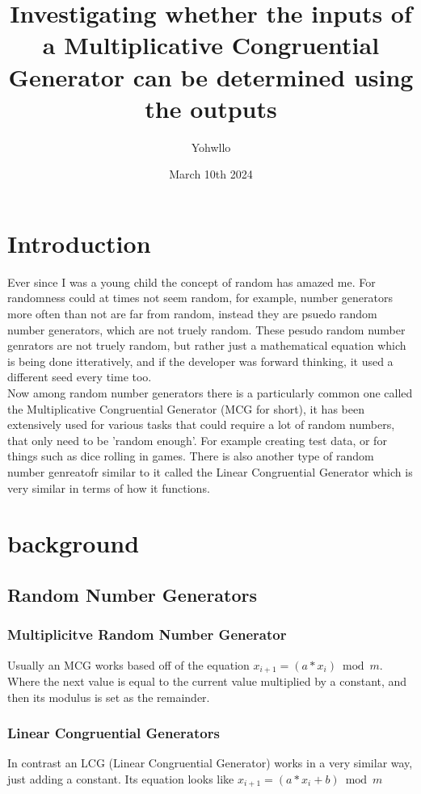 \documentclass[12pft, english]{article}
\title{Investigating whether the inputs of a Multiplicative Congruential Generator can be determined using the outputs}
\author{Yohwllo}
\date{March 10th 2024}
\begin{document}
\maketitle

\tableofcontents
\pagebreak

\begin{multicols}{2}
  \section{Introduction}
  Ever since I was a young child the concept of random has amazed me. For randomness could at times not seem random, for example, number generators more often than not are far from random, instead they are psuedo random number generators, which are not truely random. These pesudo random number genrators are not truely random, but rather just a mathematical equation which is being done itteratively, and if the developer was forward thinking, it used a different seed every time too. \\
  Now among random number generators there is a particularly common one called the Multiplicative Congruential Generator (MCG for short), it has been extensively used for various tasks that could require a lot of random numbers, that only need to be 'random enough'. For example creating test data, or for things such as dice rolling in games. There is also another type of random number genreatofr similar to it called the Linear Congruential Generator which is very similar in terms of how it functions.

  \section{background}
  \subsection{Random Number Generators}
  \subsubsection{Multiplicitve Random Number Generator}
  Usually an MCG works based off of the equation \(x_{i+1} = (a*x_{i}) \bmod m\). Where the next value is equal to the current value multiplied by a constant, and then its modulus is set as the remainder. \citep{waterlooMCG} \citep{fallOntoPlanes}
  \subsubsection{Linear Congruential Generators}
  In contrast an LCG (Linear Congruential Generator) works in a very similar way, just adding a constant. Its equation looks like \(x_{i+1} = (a*x_{i} +b ) \bmod m\) \citep{waterlooMCG}

\end{multicols}
\end{document}
